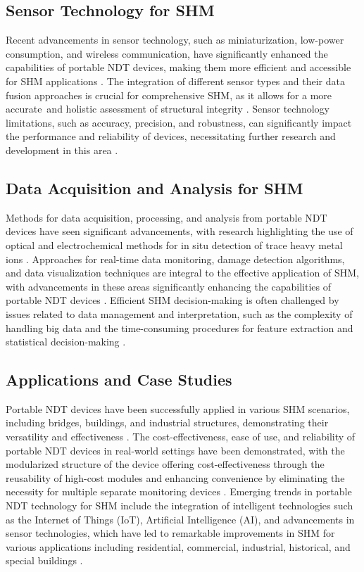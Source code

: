 \documentclass[journal, a4paper]{IEEEtran}
\begin{document}
\subsection{Sensor Technology for SHM}
Recent advancements in sensor technology, such as miniaturization, low-power consumption, and wireless communication,
have significantly enhanced the capabilities of portable NDT devices,
making them more efficient and accessible for SHM applications \cite{Hassani2023} \cite{Valeske2020}.
The integration of different sensor types and their data fusion approaches is crucial
for comprehensive SHM, as it allows for a more accurate\
and holistic assessment of structural integrity \cite{Broer2022} \cite{Azimi2020}.
Sensor technology limitations, such as accuracy, precision, and robustness,
can significantly impact the performance and reliability of devices,
necessitating further research and development in this area \cite{Varshney2021} \cite{Moore2020}.


\subsection{Data Acquisition and Analysis for SHM}
Methods for data acquisition, processing, and analysis from portable NDT
devices have seen significant advancements, with research highlighting the use of optical
and electrochemical methods for in situ detection of trace heavy metal ions \cite{Hu2023}.
Approaches for real-time data monitoring, damage detection algorithms, and data visualization techniques
are integral to the effective application of SHM, with advancements in these areas
significantly enhancing the capabilities of portable NDT devices \cite{Azimi2020} \cite{Lingxin2022}.
Efficient SHM decision-making is often challenged by issues related
to data management and interpretation, such as the complexity of handling big data and the time-consuming procedures
for feature extraction and statistical decision-making \cite{Entezami2020}.


\subsection{Applications and Case Studies}
Portable NDT devices have been successfully applied in various SHM
scenarios, including bridges, buildings, and industrial structures, demonstrating their versatility and effectiveness \cite{Parsy2018} \cite{Azimi2020}.
The cost-effectiveness, ease of use, and reliability of portable NDT
devices in real-world settings have been demonstrated, with the modularized structure of the device offering
cost-effectiveness through the reusability of high-cost modules and enhancing convenience by eliminating the
necessity for multiple separate monitoring devices \cite{Lee2023}.
Emerging trends in portable NDT technology for SHM
include the integration of intelligent technologies such as the Internet of Things (IoT), Artificial Intelligence (AI),
and advancements in sensor technologies, which have led to remarkable improvements in SHM for various applications
including residential, commercial, industrial, historical, and special buildings \cite{Vijayan2023} \cite{Hassani2023}. 
\end{document}

